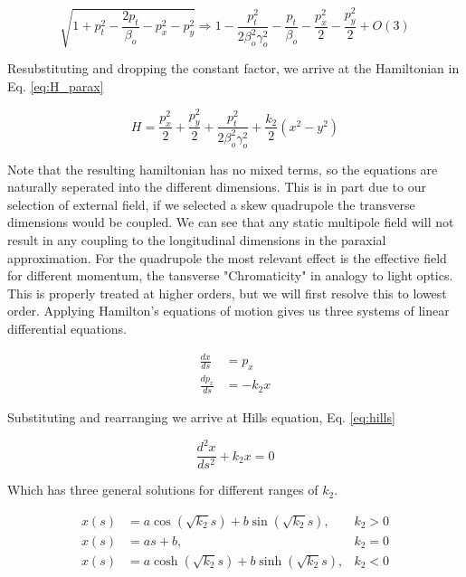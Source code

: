 \begin{equation} \label{eq:sqrt_taylor}
	\sqrt{1 + p_t^2 - \frac{2p_t}{\beta_o} - p_x^2 - p_y^2} \Rightarrow 1 - \frac{p_t^2}{2\beta_o^2\gamma_o^2} - \frac{p_t}{\beta_o} - \frac{p_x^2}{2} - \frac{p_y^2}{2} + O(3)
\end{equation}

Resubstituting and dropping the constant factor, we arrive at the Hamiltonian in Eq. \ref{eq:H_parax}

\begin{equation} \label{eq:H_parax}
	H = \frac{p_x^2}{2} + \frac{p_y^2}{2} + \frac{p_t^2}{2\beta_o^2\gamma_o^2} + \frac{k_2}{2}(x^2 - y^2)
\end{equation}

Note that the resulting hamiltonian has no mixed terms, so the equations are naturally seperated into the different dimensions. This is in part due to our selection of external field, if we selected a skew quadrupole the transverse dimensions would be coupled. We can see that any static multipole field will not result in any coupling to the longitudinal dimensions in the paraxial approximation. For the quadrupole the most relevant effect is the effective field for different momentum, the tansverse "Chromaticity" in analogy to light optics. This is properly treated at higher orders, but we will first resolve this to lowest order. Applying Hamilton's equations of motion gives us three systems of linear differential equations.

\begin{equation} \label{eq:quad_diffeq}
\begin{split}
	\frac{dx}{ds} &= p_x\\ 
	\frac{dp_x}{ds} &= -k_2 x
\end{split}
\end{equation}

Substituting and rearranging we arrive at Hills equation, Eq. \ref{eq:hills}

\begin{equation} \label{eq:hills}
	\frac{d^2 x}{ds^2} + k_2 x = 0
\end{equation}

Which has three general solutions for different ranges of $k_2$.

\begin{align} \label{eq:hillSol}
	x(s) &= a \cos{\left(\sqrt{k_2} s\right)} + b \sin{\left(\sqrt{k_2} s\right)}, &k_2>0\\
	x(s) &= a s + b, &k_2 =0 \\
	x(s) &= a \cosh{\left(\sqrt{k_2} s\right)} + b \sinh{\left(\sqrt{k_2} s\right)}, &k_2<0
\end{align}

